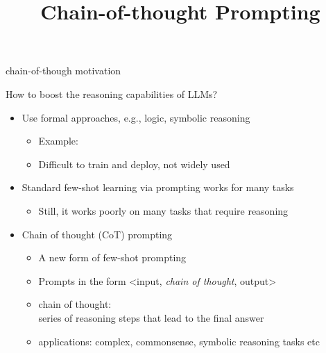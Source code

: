 



\newcommand{\learninggoals}{
\item illustrate chain-of-thought and point out the benefits it brings to LLMs
\item illustrate tree-of-thought and point out the benefits it brings to LLMs 
}

\def\myblue#1{\textcolor{texblue}{#1}}

\title{Chain-of-thought Prompting}
\date{}




\begin{vbframe}{chain-of-though motivation}

\vfill

How to boost the reasoning capabilities of LLMs? 

\begin{itemize}
\item Use formal approaches, e.g., logic, symbolic reasoning
    \begin{itemize}
    \item Example: 
\item Difficult to train and deploy, not widely used
    \end{itemize}
\item Standard few-shot learning via prompting works for many tasks
    \begin{itemize}
    \item Still, it works poorly on many tasks that require reasoning
    \end{itemize}
\item Chain of thought (CoT) prompting
    \begin{itemize}
    \item A new form of few-shot prompting
    \item Prompts in the form <input, \textit{chain of thought}, output>
    \item chain of thought:\\ series of reasoning steps that
    lead to the final answer
    \item applications: complex, commonsense, symbolic
    reasoning tasks etc
    \end{itemize}

\end{itemize}

\vfill

\end{vbframe}

